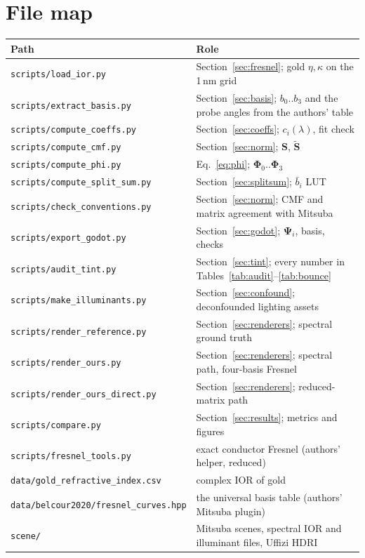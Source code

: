 \documentclass[11pt,a4paper]{article}
\newcommand{\mS}{\mathbf{S}}
\newcommand{\mSd}{\tilde{\mathbf{S}}}
\newcommand{\mPhi}{\boldsymbol{\Phi}}
\newcommand{\mPsi}{\boldsymbol{\Psi}}
\newcommand{\lam}{\lambda}
\newcommand{\file}[1]{\texttt{#1}}
\begin{document}
\section{File map}

\begin{table}[h]\centering\small
\begin{tabular}{@{}lp{8.6cm}@{}}
\toprule
Path & Role \\
\midrule
\file{scripts/load\_ior.py}            & Section~\ref{sec:fresnel}; gold $\eta,\kappa$ on the 1\,nm grid \\
\file{scripts/extract\_basis.py}       & Section~\ref{sec:basis}; $b_0..b_3$ and the probe angles from the authors' table \\
\file{scripts/compute\_coeffs.py}      & Section~\ref{sec:coeffs}; $c_i(\lam)$, fit check \\
\file{scripts/compute\_cmf.py}         & Section~\ref{sec:norm}; $\mS$, $\mSd$ \\
\file{scripts/compute\_phi.py}         & Eq.~\eqref{eq:phi}; $\mPhi_0..\mPhi_3$ \\
\file{scripts/compute\_split\_sum.py}  & Section~\ref{sec:splitsum}; $\bar b_i$ LUT \\
\file{scripts/check\_conventions.py}   & Section~\ref{sec:norm}; CMF and matrix agreement with Mitsuba \\
\file{scripts/export\_godot.py}        & Section~\ref{sec:godot}; $\mPsi_i$, basis, checks \\
\file{scripts/audit\_tint.py}          & Section~\ref{sec:tint}; every number in Tables~\ref{tab:audit}--\ref{tab:bounce} \\
\file{scripts/make\_illuminants.py}    & Section~\ref{sec:confound}; deconfounded lighting assets \\
\file{scripts/render\_reference.py}    & Section~\ref{sec:renderers}; spectral ground truth \\
\file{scripts/render\_ours.py}         & Section~\ref{sec:renderers}; spectral path, four-basis Fresnel \\
\file{scripts/render\_ours\_direct.py} & Section~\ref{sec:renderers}; reduced-matrix path \\
\file{scripts/compare.py}              & Section~\ref{sec:results}; metrics and figures \\
\file{scripts/fresnel\_tools.py}       & exact conductor Fresnel (authors' helper, reduced) \\
\file{data/gold\_refractive\_index.csv} & complex IOR of gold \\
\file{data/belcour2020/fresnel\_curves.hpp} & the universal basis table (authors' Mitsuba plugin) \\
\file{scene/}                          & Mitsuba scenes, spectral IOR and illuminant files, Uffizi HDRI \\
\bottomrule
\end{tabular}
\end{table}
\end{document}

